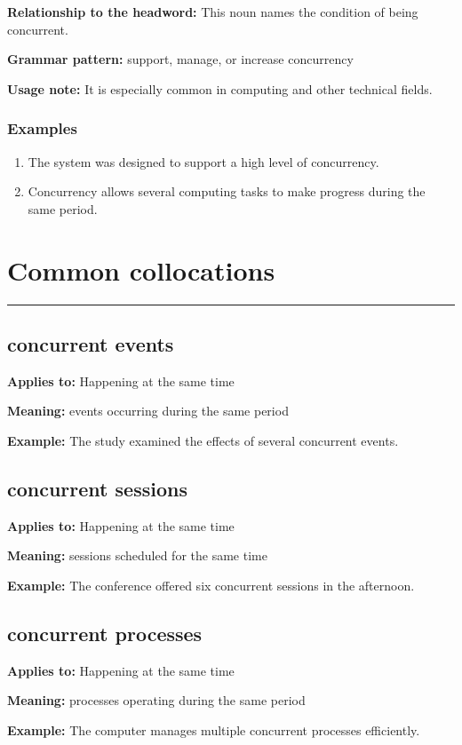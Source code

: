 \documentclass[11pt]{article}
\newcommand{\sectionrule}{\par\vspace{-0.5em}\noindent\textcolor{Accent}{\rule{\linewidth}{0.6pt}}\par}
\begin{document}
\textbf{Relationship to the headword:} This noun names the condition of being concurrent.

\textbf{Grammar pattern:} support, manage, or increase concurrency

\textbf{Usage note:} It is especially common in computing and other technical fields.

\subsubsection{Examples}
\begin{enumerate}
  \item The system was designed to support a high level of concurrency.
  \item Concurrency allows several computing tasks to make progress during the same period.
\end{enumerate}

\section{Common collocations}
\sectionrule
\subsection{concurrent events}
\textbf{Applies to:} Happening at the same time

\textbf{Meaning:} events occurring during the same period

\textbf{Example:} The study examined the effects of several concurrent events.

\subsection{concurrent sessions}
\textbf{Applies to:} Happening at the same time

\textbf{Meaning:} sessions scheduled for the same time

\textbf{Example:} The conference offered six concurrent sessions in the afternoon.

\subsection{concurrent processes}
\textbf{Applies to:} Happening at the same time

\textbf{Meaning:} processes operating during the same period

\textbf{Example:} The computer manages multiple concurrent processes efficiently.
\end{document}

